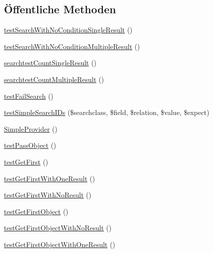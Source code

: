 \subsection*{Öffentliche Methoden}
\begin{DoxyCompactItemize}
\item 
\hyperlink{classTests_1_1Feature_1_1ObjectSearchTest_af482a1118b1bb98cc6d97dfe4af957d1}{test\+Search\+With\+No\+Condition\+Single\+Result} ()
\item 
\hyperlink{classTests_1_1Feature_1_1ObjectSearchTest_a2c66429afea49f29430c30bb73f9dd58}{test\+Search\+With\+No\+Condition\+Multiple\+Result} ()
\item 
\hyperlink{classTests_1_1Feature_1_1ObjectSearchTest_a54af6d0a4aaccf6e7bb5737e01bcf301}{searchtest\+Count\+Single\+Result} ()
\item 
\hyperlink{classTests_1_1Feature_1_1ObjectSearchTest_a27eb0420bce1a68d88d9d0d4afae4e19}{searchtest\+Count\+Multiple\+Result} ()
\item 
\hyperlink{classTests_1_1Feature_1_1ObjectSearchTest_a3a258e0cd746768cda1aec35a47b0f78}{test\+Fail\+Search} ()
\item 
\hyperlink{classTests_1_1Feature_1_1ObjectSearchTest_a8dc4019e33415b79e5561ca7bfe600bc}{test\+Simple\+Search\+I\+Ds} (\$searchclass, \$field, \$relation, \$value, \$expect)
\item 
\hyperlink{classTests_1_1Feature_1_1ObjectSearchTest_aeb351f1c361a4d2c3ba9b0b21512dd34}{Simple\+Provider} ()
\item 
\hyperlink{classTests_1_1Feature_1_1ObjectSearchTest_a168121ce6304ec60513d0439bf7b31c0}{test\+Pass\+Object} ()
\item 
\hyperlink{classTests_1_1Feature_1_1ObjectSearchTest_aab258bfe3ea7eaa2e9def65d7c4eb5d1}{test\+Get\+First} ()
\item 
\hyperlink{classTests_1_1Feature_1_1ObjectSearchTest_a30d616a36f0414cb07ddab72c9935fb6}{test\+Get\+First\+With\+One\+Result} ()
\item 
\hyperlink{classTests_1_1Feature_1_1ObjectSearchTest_a1c60282e18bb8ba289f15c7fcd4cce87}{test\+Get\+First\+With\+No\+Result} ()
\item 
\hyperlink{classTests_1_1Feature_1_1ObjectSearchTest_afdb61b2b76532c4c3e9a72198b9bc13c}{test\+Get\+First\+Object} ()
\item 
\hyperlink{classTests_1_1Feature_1_1ObjectSearchTest_acc045f86d53ae7d02eddebc2f1b0ff24}{test\+Get\+First\+Object\+With\+No\+Result} ()
\item 
\hyperlink{classTests_1_1Feature_1_1ObjectSearchTest_a87ddbddc768599189a2a8ae3de12a365}{test\+Get\+First\+Object\+With\+One\+Result} ()

\end{DoxyCompactItemize}
